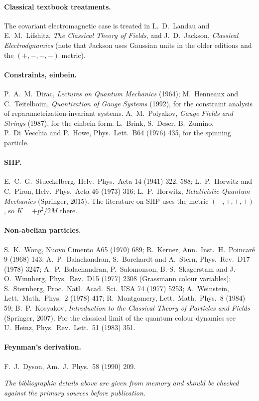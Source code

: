 \documentclass[11pt,a4paper]{book}
\numberwithin{equation}{section}
\theoremstyle{definition}
\theoremstyle{remark}
\begin{document}
\paragraph{Classical textbook treatments.}  The covariant electromagnetic
case is treated in L.~D.\ Landau and E.~M.\ Lifshitz, \emph{The Classical
Theory of Fields}, and J.~D.\ Jackson, \emph{Classical Electrodynamics}
(note that Jackson uses Gaussian units in the older editions and the
$(+,-,-,-)$ metric).

\paragraph{Constraints, einbein.}  P.~A.\ M.\ Dirac, \emph{Lectures on
Quantum Mechanics} (1964); M.\ Henneaux and C.\ Teitelboim,
\emph{Quantization of Gauge Systems} (1992), for the constraint analysis
of reparametrization-invariant systems.  A.~M.\ Polyakov, \emph{Gauge
Fields and Strings} (1987), for the einbein form.  L.\ Brink, S.\
Deser, B.\ Zumino, P.\ Di~Vecchia and P.\ Howe, Phys.\ Lett.\ B64 (1976)
435, for the spinning particle.

\paragraph{SHP.}  E.~C.~G.\ Stueckelberg, Helv.\ Phys.\ Acta 14 (1941) 322, 588;
L.~P.\ Horwitz and C.\ Piron, Helv.\ Phys.\ Acta 46 (1973) 316;
L.~P.\ Horwitz, \emph{Relativistic Quantum Mechanics} (Springer, 2015).
The literature on SHP uses the metric $(-,+,+,+)$, so $K=+p^2/2M$ there.

\paragraph{Non-abelian particles.}  S.~K.\ Wong, Nuovo Cimento A65 (1970)
689; R.\ Kerner, Ann.\ Inst.\ H.\ Poincar\'e 9 (1968) 143;
A.~P.\ Balachandran, S.\ Borchardt and A.\ Stern, Phys.\ Rev.\ D17 (1978) 3247;
A.~P.\ Balachandran, P.\ Salomonson, B.-S.\ Skagerstam and J.-O.\ Winnberg,
Phys.\ Rev.\ D15 (1977) 2308 (Grassmann colour variables);
S.\ Sternberg, Proc.\ Natl.\ Acad.\ Sci.\ USA 74 (1977) 5253;
A.\ Weinstein, Lett.\ Math.\ Phys.\ 2 (1978) 417;
R.\ Montgomery, Lett.\ Math.\ Phys.\ 8 (1984) 59;
B.\ P.\ Kosyakov, \emph{Introduction to the Classical Theory of Particles
and Fields} (Springer, 2007).  For the classical limit of the quantum
colour dynamics see U.\ Heinz, Phys.\ Rev.\ Lett.\ 51 (1983) 351.

\paragraph{Feynman's derivation.}  F.~J.\ Dyson, Am.\ J.\ Phys.\ 58 (1990) 209.

\medskip
\noindent\emph{The bibliographic details above are given from memory and
should be checked against the primary sources before publication.}
\end{document}
